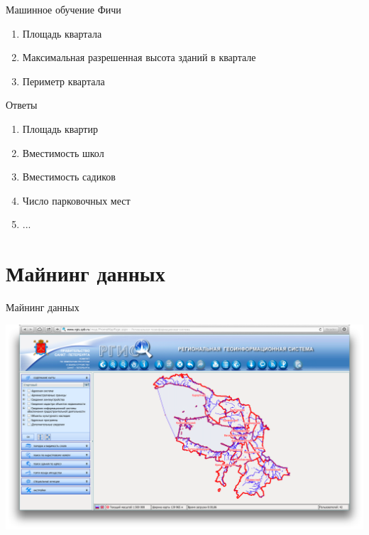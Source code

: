 \documentclass[14pt, fleqn, xcolor={dvipsnames, table}]{beamer}
\begin{document}
        \begin{frame}{Машинное обучение}
            Фичи
            \begin{enumerate}
               \item Площадь квартала
               \item Максимальная разрешенная высота зданий в квартале
               \item Периметр квартала
            \end{enumerate}
            Ответы
            \begin{enumerate}
               \item Площадь квартир
               \item Вместимость школ
               \item Вместимость садиков
               \item Число парковочных мест
               \item ...
            \end{enumerate}           
        \end{frame}
        
    \section{Майнинг данных}         
        
        \begin{frame}{Майнинг данных}
            \begin{center}
                \includegraphics[scale=0.23]{rgis.png}
            \end{center} 
        \end{frame}
        
\end{document}
